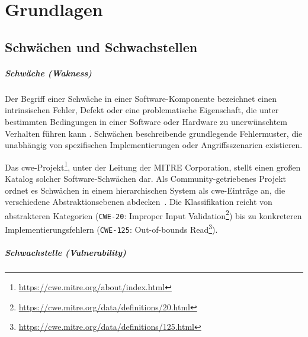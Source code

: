 \chapter{Grundlagen}\label{ch:grundlagen}


\section{Schwächen und Schwachstellen}\label{sec:def-weakness-vulnerability}


\paragraph{Schwäche (Wakness)}
Der Begriff einer Schwäche in einer Software-Komponente bezeichnet einen intrinsischen Fehler, Defekt oder eine problematische Eigenschaft, die unter bestimmten Bedingungen in einer Software oder Hardware zu unerwünschtem Verhalten führen kann \autocite{Ross_Winstead_McEvilley_2022}.
Schwächen beschreibende grundlegende Fehlermuster, die unabhängig von spezifischen Implementierungen oder Angriffsszenarien existieren.

Das \acrfull{cwe}-Projekt\footnote{\url{https://cwe.mitre.org/about/index.html}}, unter der Leitung der MITRE Corporation, stellt einen großen Katalog solcher Software-Schwächen dar.
Als Community-getriebenes Projekt ordnet es Schwächen in einem hierarchischen System als \acrshort{cwe}-Einträge an, die verschiedene Abstraktionsebenen abdecken\ \autocite{wu2016cwe}.
Die Klassifikation reicht von abstrakteren Kategorien (\verb+CWE-20+: Improper Input Validation\footnote{\url{https://cwe.mitre.org/data/definitions/20.html}}) bis zu konkreteren Implementierungsfehlern (\verb+CWE-125+: Out-of-bounds Read\footnote{\url{https://cwe.mitre.org/data/definitions/125.html}}).

\paragraph{Schwachstelle (Vulnerability)}

